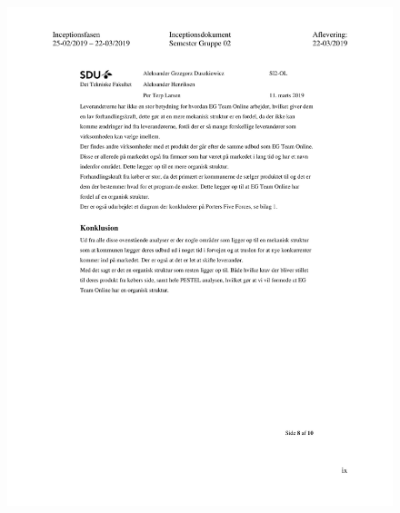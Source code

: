 \begin{figure}[hb]
  \includegraphics[scale = 0.33]{./PNG/Inceptions/Gruppe02+InceptionsDokument-42.jpg} 
\end{figure}

